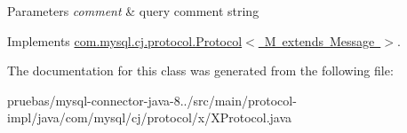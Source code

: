 \begin{DoxyParams}{Parameters}
{\em comment} & query comment string \\
\hline
\end{DoxyParams}


Implements \mbox{\hyperlink{interfacecom_1_1mysql_1_1cj_1_1protocol_1_1_protocol_ace5604859b8b79df6dcf91bee7c1cc6c}{com.\+mysql.\+cj.\+protocol.\+Protocol$<$ M extends Message $>$}}.



The documentation for this class was generated from the following file\+:\begin{DoxyCompactItemize}
\item 
pruebas/mysql-\/connector-\/java-\/8../src/main/protocol-\/impl/java/com/mysql/cj/protocol/x/X\+Protocol.\+java\end{DoxyCompactItemize}
